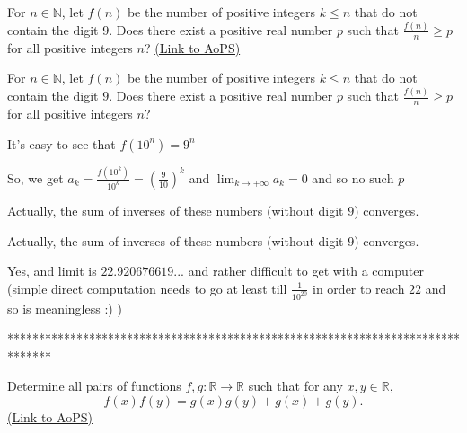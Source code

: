 \begin{problem}
	For $n \in \mathbb N$, let $f(n)$ be the number of positive integers $k \leq n$ that do not contain the digit $9$. Does there exist a positive real number $p$ such that $\frac{f(n)}{n} \geq p$ for all positive integers $n$?
	\flushright \href{https://artofproblemsolving.com/community/c6h407851}{(Link to AoPS)}
\end{problem}



\begin{solution}
	\begin{tcolorbox}For $n \in \mathbb N$, let $f(n)$ be the number of positive integers $k \leq n$ that do not contain the digit $9$. Does there exist a positive real number $p$ such that $\frac{f(n)}{n} \geq p$ for all positive integers $n$?\end{tcolorbox}
It's easy to see that $f(10^n)=9^n$

So, we get $a_k=\frac{f(10^k)}{10^k}=\left(\frac 9{10}\right)^k$ and $\lim_{k\to+\infty}a_k=0$ and so $\boxed{\text{no such }p}$
\end{solution}



\begin{solution}
	Actually, the sum of inverses of these numbers (without digit $9$) converges.
\end{solution}



\begin{solution}
	\begin{tcolorbox}Actually, the sum of inverses of these numbers (without digit $9$) converges.\end{tcolorbox}
Yes, and limit is $22.920676619...$ and rather difficult to get with a computer (simple direct computation needs to go at least till $\frac 1{10^{20}}$ in order to reach $22$  and so is meaningless  :) )
\end{solution}
*******************************************************************************
-------------------------------------------------------------------------------

\begin{problem}
	Determine all pairs of functions $f,g:\mathbb{R}\rightarrow\mathbb{R}$ such that for any $x,y\in \mathbb{R}$,
\[f(x)f(y)=g(x)g(y)+g(x)+g(y).\]
	\flushright \href{https://artofproblemsolving.com/community/c6h408195}{(Link to AoPS)}
\end{problem}



